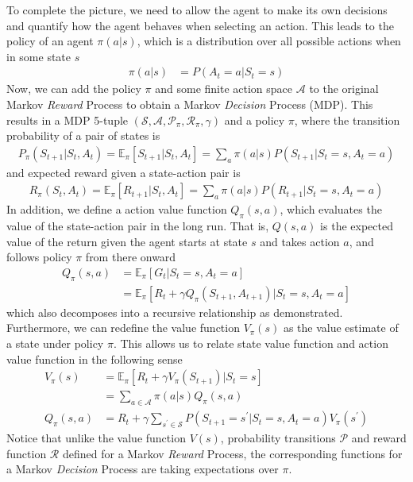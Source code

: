 \documentclass[12pt]{report}
\begin{document}
To complete the picture, we need to allow the agent to make its own decisions and quantify how the agent behaves when selecting an action. This leads to the policy of an agent $\pi(a|s)$, which is a distribution over all possible actions when in some state $s$
\begin{align}
    \pi(a|s) &= P(A_t=a|S_t=s)
\end{align}
Now, we can add the policy $\pi$ and some finite action space $\mathcal{A}$ to the original Markov \textit{Reward} Process to obtain a Markov \textit{Decision} Process (MDP). This results in a MDP 5-tuple $(\mathcal{S},\mathcal{A},\mathcal{P}_\pi,\mathcal{R}_\pi,\gamma)$ and a policy $\pi$, where the transition probability of a pair of states is
\begin{align}
    P_\pi(S_{t+1}|S_t,A_t) = \mathbb{E}_\pi [S_{t+1}|S_t,A_t] = \sum_a \pi(a|s) P(S_{t+1}|S_t=s,A_t=a) \nonumber
\end{align}
and expected reward given a state-action pair is
\begin{align}
    R_\pi(S_t,A_t) = \mathbb{E}_\pi [R_{t+1}|S_t,A_t] = \sum_a \pi(a|s) P(R_{t+1}|S_t=s,A_t=a) \nonumber
\end{align}
In addition, we define a action value function $Q_\pi(s,a)$, which evaluates the value of the state-action pair in the long run. That is, $Q(s,a)$ is the expected value of the return given the agent starts at state $s$ and takes action $a$, and follows policy $\pi$ from there onward
\begin{align}
    Q_\pi(s,a) &= \mathbb{E}_\pi[G_t|S_t=s,A_t=a] \nonumber\\
    &=\mathbb{E}_\pi[R_t+\gamma Q_\pi(S_{t+1},A_{t+1})|S_t=s,A_t=a] \nonumber
\end{align}
which also decomposes into a recursive relationship as demonstrated. Furthermore, we can redefine the value function $V_\pi(s)$ as the value estimate of a state under policy $\pi$. This allows us to relate state value function and action value function in the following sense
\begin{align}
    V_\pi(s) &= \mathbb{E}_\pi\left[R_t + \gamma V_\pi(S_{t+1}) | S_t = s\right]\\
    &= \sum_{a\in \mathcal{A}} \pi(a|s) Q_\pi(s,a) \nonumber \\
    Q_\pi(s,a) &= R_t + \gamma \sum_{s^\prime \in \mathcal{S}} P(S_{t+1}=s^\prime|S_t=s,A_t=a) V_\pi(s^\prime)
\end{align}
Notice that unlike the value function $V(s)$, probability transitions $\mathcal{P}$ and reward function $\mathcal{R}$ defined for a Markov \textit{Reward} Process, the corresponding functions for a Markov \textit{Decision} Process are taking expectations over $\pi$.
\end{document}
